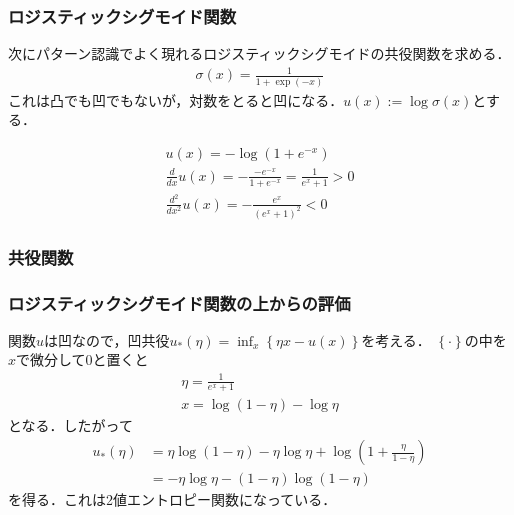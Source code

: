 \documentclass[10pt,hyperref={unicode}]{beamer}
\newcommand{\parentheses}[1]{\left(#1\right)}
\newcommand{\braces}[1]{\left\{#1\right\}}
\begin{document}
\begin{frame}
\frametitle{ロジスティックシグモイド関数}
次にパターン認識でよく現れるロジスティックシグモイドの共役関数を求める．
\begin{align}
    \sigma\parentheses{x} = \frac{1}{1 + \exp \parentheses{-x}} \tag{10.134}
\end{align}
これは凸でも凹でもないが，対数をとると凹になる．$u(x) := \log \sigma \parentheses{x}$とする．

\begin{gather*}
    u\parentheses{x} = -\log\parentheses{1 + e^{-x}} \\
    \frac{d}{dx}u\parentheses{x}
    = -\frac{-e^{-x}}{1 + e^{-x}}
    = \frac{1}{e^x + 1} > 0 \\
    \frac{d^2}{dx^2}u\parentheses{x}
    = -\frac{e^x}{\parentheses{e^x + 1}^2} < 0
\end{gather*}
\end{frame}

\begin{frame}
\frametitle{共役関数}
\begin{center}
\end{center}
\end{frame}

\begin{frame}
\frametitle{ロジスティックシグモイド関数の上からの評価}
関数$u$は凹なので，凹共役$u_*\parentheses{\eta} = \inf_x \braces{\eta x - u\parentheses{x}}$を考える．
$\braces{\cdot}$の中を$x$で微分して$0$と置くと
\begin{gather*}
    \eta = \frac{1}{e^x + 1} \\
    x = \log \parentheses{1-\eta} - \log \eta
\end{gather*}
となる．したがって
\begin{align*}
    u_*\parentheses{\eta} &= \eta \log \parentheses{1-\eta} - \eta \log \eta + \log \parentheses{1 + \frac{\eta}{1 - \eta}} \\
                          &= - \eta \log \eta - \parentheses{1 - \eta} \log \parentheses{1-\eta}
\end{align*}
を得る．これは2値エントロピー関数になっている．
\end{frame}
\end{document}
